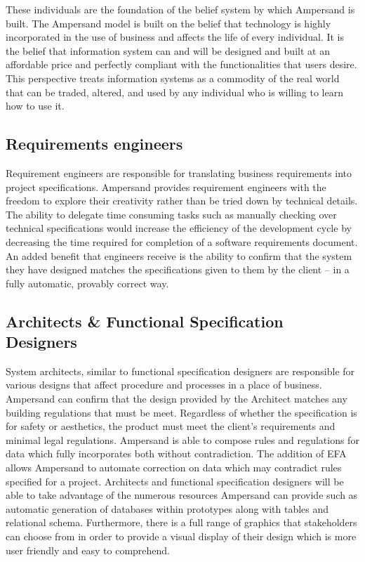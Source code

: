 \documentclass[12pt]{report}
\begin{document}
These individuals are the foundation of
the belief system by which Ampersand is built. The Ampersand model is built on
the belief that technology is highly incorporated in the use of business and
affects the life of every individual.  It is the belief that information system
can and will be designed and built at an affordable price and perfectly
compliant with the functionalities that users desire. This perspective treats
information systems as a commodity of the real world that can be traded,
altered, and used by any individual who is willing to learn how to use it.
\subsection{Requirements engineers}\label{subsec:BusReq}
Requirement engineers are responsible for translating business 
requirements into project specifications. Ampersand provides requirement 
engineers with the freedom to explore their creativity rather than be tried 
down by technical details. The ability to delegate time consuming tasks such as 
manually checking over technical specifications would increase the efficiency 
of the development cycle by decreasing the time required for 
completion of a software requirements document.
An added benefit that engineers receive is the ability to confirm 
that the system they have designed matches the specifications
 given to them by the client -- in a fully automatic, provably correct way.  
\subsection{Architects \& Functional Specification Designers}
System architects, similar to functional specification designers are 
responsible for various designs that affect procedure and processes in a place 
of business. Ampersand can confirm that the design provided by 
the Architect matches any building regulations that must be meet. Regardless of 
whether the specification is for safety or aesthetics, the product must meet the 
client's requirements and minimal legal regulations. Ampersand is able to 
compose rules and regulations for data which fully incorporates both without 
contradiction. The addition of EFA allows Ampersand to automate correction  
on data which may contradict rules specified for a project. Architects and 
functional specification designers will be able to take advantage of the 
numerous resources Ampersand can provide such as automatic generation of 
databases within prototypes along with tables and relational schema. 
Furthermore, there is a full range of graphics that stakeholders can choose 
from in order to provide a visual display of their design which is more user friendly 
and easy to comprehend.
\end{document}
